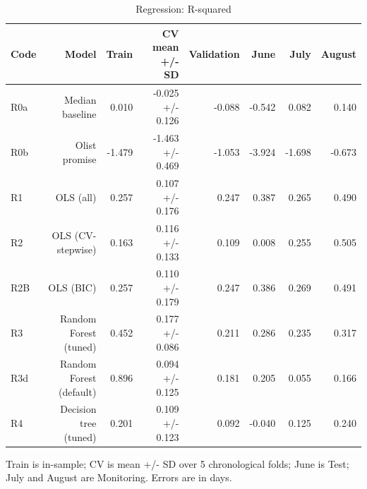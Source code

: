 \begin{table}[htbp]
\centering
\small
\caption{Regression: R-squared}
\begin{tabular}{lrrrrrrr}
\toprule
Code & Model & Train & CV mean +/- SD & Validation & June & July & August \\
\midrule
R0a & Median baseline & 0.010 & -0.025 +/- 0.126 & -0.088 & -0.542 & 0.082 & 0.140 \\
R0b & Olist promise & -1.479 & -1.463 +/- 0.469 & -1.053 & -3.924 & -1.698 & -0.673 \\
R1 & OLS (all) & 0.257 & 0.107 +/- 0.176 & 0.247 & 0.387 & 0.265 & 0.490 \\
R2 & OLS (CV-stepwise) & 0.163 & 0.116 +/- 0.133 & 0.109 & 0.008 & 0.255 & 0.505 \\
R2B & OLS (BIC) & 0.257 & 0.110 +/- 0.179 & 0.247 & 0.386 & 0.269 & 0.491 \\
R3 & Random Forest (tuned) & 0.452 & 0.177 +/- 0.086 & 0.211 & 0.286 & 0.235 & 0.317 \\
R3d & Random Forest (default) & 0.896 & 0.094 +/- 0.125 & 0.181 & 0.205 & 0.055 & 0.166 \\
R4 & Decision tree (tuned) & 0.201 & 0.109 +/- 0.123 & 0.092 & -0.040 & 0.125 & 0.240 \\
\bottomrule
\end{tabular}
\par\smallskip\begin{minipage}{\linewidth}\footnotesize Train is in-sample; CV is mean +/- SD over 5 chronological folds; June is Test; July and August are Monitoring. Errors are in days.\end{minipage}
\end{table}


